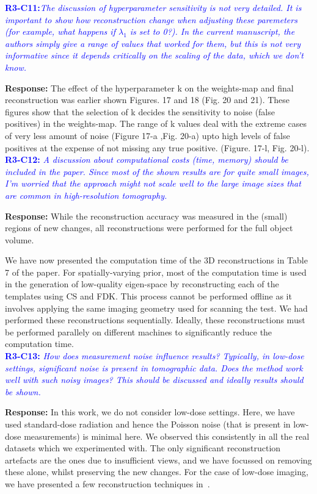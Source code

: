 \documentclass{article}
\begin{document}
\textcolor{blue}{\textbf{R3-C11:}\textit{The discussion of hyperparameter sensitivity is not very detailed. It is important to show how reconstruction change when adjusting these paremeters (for example, what happens if $\lambda_1$ is set to 0?). In the current manuscript, the authors simply give a range of values that worked for them, but this is not very informative since it depends critically on the scaling of the data, which we don't know.}}

\textbf{Response:} The effect of the hyperparameter k on the weights-map and final reconstruction was earlier shown Figures. 17 and 18 (Fig. 20 and 21). These figures show that the selection of k decides the sensitivity to noise (false positives) in the weights-map. The range of k values deal with the extreme cases of very less amount of noise (Figure 17-a ,Fig. 20-a) upto high levels of false positives at the expense of not missing any true positive. (Figure. 17-l, Fig. 20-l).\\

\textcolor{blue}{\textbf{R3-C12:}\textit{ A discussion about computational costs (time, memory) should be included in the paper. Since most of the shown results are for quite small images, I'm worried that the approach might not scale well to the large image sizes that are common in high-resolution tomography.   }}

\textbf{Response:} While the reconstruction accuracy was measured in the (small) regions of new changes, all reconstructions were performed for the full object volume. 

We have now presented the computation time of the 3D reconstructions in Table 7 of the paper. 
For spatially-varying prior, most of the computation time is used in the generation of low-quality eigen-space by reconstructing  each of the templates using CS and FDK. This process cannot be performed offline as it involves applying the same imaging geometry used for scanning the test. We had performed these reconstructions sequentially. Ideally, these reconstructions must be performed parallely on different machines to significantly reduce the computation time.\\

\textcolor{blue}{\textbf{R3-C13:}\textit{ How does measurement noise influence results? Typically, in low-dose settings, significant noise is present in tomographic data. Does the method work well with such noisy images? This should be discussed and ideally results should be shown.}}

\textbf{Response:} In this work, we do not consider low-dose settings. Here, we have used standard-dose radiation and hence the Poisson noise (that is present in low-dose measurements) is minimal here. We observed this consistently in all the real datasets which we experimented with. The only significant reconstruction artefacts are the ones due to insufficient views, and we have focussed on removing these alone, whilst preserving the new changes.
For the case of low-dose imaging, we have presented a few reconstruction techniques in~\cite{gopal2019low}.\\
\end{document}
